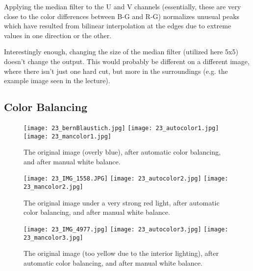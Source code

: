 \documentclass[11pt,a4]{article}
\begin{document}
Applying the median filter to the U and V channels (essentially, these are very close to the color differences between B-G and R-G) normalizes unusual peaks which have resulted from bilinear interpolation at the edges due to extreme values in one direction or the other.

Interestingly enough, changing the size of the median filter (utilized here 5x5) doesn't change the output. This would probably be different on a different image, where there isn't just one hard cut, but more in the surroundings (e.g. the example image seen in the lecture).


\newpage
\FloatBarrier
\subsection{Color Balancing}
\begin{figure}[htb]
    \begin{center}
    	\texttt{[image: 23\_bernBlaustich.jpg]}
        \texttt{[image: 23\_autocolor1.jpg]}
        \texttt{[image: 23\_mancolor1.jpg]}
        \caption{The original image (overly blue), after automatic color balancing, and after manual white balance. \label{img:color1}}
    \end{center}
\end{figure}

\begin{figure}[htb]
    \begin{center}
    	\texttt{[image: 23\_IMG\_1558.JPG]}
        \texttt{[image: 23\_autocolor2.jpg]}
        \texttt{[image: 23\_mancolor2.jpg]}
        \caption{The original image under a very strong red light, after automatic color balancing, and after manual white balance. \label{img:color2}}
    \end{center}
\end{figure}

\begin{figure}[htb]
    \begin{center}
    	\texttt{[image: 23\_IMG\_4977.jpg]}
        \texttt{[image: 23\_autocolor3.jpg]}
        \texttt{[image: 23\_mancolor3.jpg]}
        \caption{The original image (too yellow due to the interior lighting), after automatic color balancing, and after manual white balance. \label{img:color3}}
    \end{center}
\end{figure}
\end{document}
